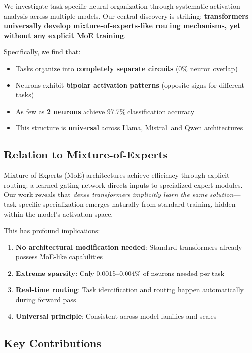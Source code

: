 \documentclass{article}
\begin{document}
We investigate task-specific neural organization through systematic activation analysis across multiple models. Our central discovery is striking: \textbf{transformers universally develop mixture-of-experts-like routing mechanisms, yet without any explicit MoE training}.

Specifically, we find that:
\begin{itemize}
    \item Tasks organize into \textbf{completely separate circuits} (0\% neuron overlap)
    \item Neurons exhibit \textbf{bipolar activation patterns} (opposite signs for different tasks)
    \item As few as \textbf{2 neurons} achieve 97.7\% classification accuracy
    \item This structure is \textbf{universal} across Llama, Mistral, and Qwen architectures
\end{itemize}

\subsection{Relation to Mixture-of-Experts}

Mixture-of-Experts (MoE) architectures \cite{shazeer2017outrageously,fedus2022switch} achieve efficiency through explicit routing: a learned gating network directs inputs to specialized expert modules. Our work reveals that \textit{dense transformers implicitly learn the same solution}—task-specific specialization emerges naturally from standard training, hidden within the model's activation space.

This has profound implications:
\begin{enumerate}
    \item \textbf{No architectural modification needed}: Standard transformers already possess MoE-like capabilities
    \item \textbf{Extreme sparsity}: Only 0.0015--0.004\% of neurons needed per task
    \item \textbf{Real-time routing}: Task identification and routing happen automatically during forward pass
    \item \textbf{Universal principle}: Consistent across model families and scales
\end{enumerate}

\subsection{Key Contributions}
\end{document}
